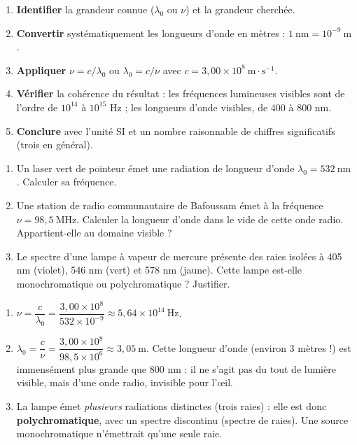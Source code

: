 \documentclass[11pt]{article}
\begin{document}
\begin{methode}[Exploiter la relation $\lambda_0 = c/\nu$ sans se tromper]
\begin{enumerate}
\item \textbf{Identifier} la grandeur connue ($\lambda_0$ ou $\nu$) et la grandeur cherchée.
\item \textbf{Convertir} systématiquement les longueurs d'onde en mètres : $1\ \text{nm} = 10^{-9}\ \text{m}$.
\item \textbf{Appliquer} $\nu = c/\lambda_0$ ou $\lambda_0 = c/\nu$ avec $c = 3{,}00 \times 10^{8}\ \text{m}\cdot\text{s}^{-1}$.
\item \textbf{Vérifier} la cohérence du résultat : les fréquences lumineuses visibles sont de l'ordre de $10^{14}$ à $10^{15}$ Hz ; les longueurs d'onde visibles, de 400 à 800 nm.
\item \textbf{Conclure} avec l'unité SI et un nombre raisonnable de chiffres significatifs (trois en général).
\end{enumerate}
\end{methode}

\begin{exercice}
\begin{enumerate}
\item Un laser vert de pointeur émet une radiation de longueur d'onde $\lambda_0 = 532\ \text{nm}$. Calculer sa fréquence.
\item Une station de radio communautaire de Bafoussam émet à la fréquence $\nu = 98{,}5\ \text{MHz}$. Calculer la longueur d'onde dans le vide de cette onde radio. Appartient-elle au domaine visible ?
\item Le spectre d'une lampe à vapeur de mercure présente des raies isolées à 405 nm (violet), 546 nm (vert) et 578 nm (jaune). Cette lampe est-elle monochromatique ou polychromatique ? Justifier.
\end{enumerate}
\end{exercice}

\begin{corrige}[Exercice]
\begin{enumerate}
\item $\nu = \dfrac{c}{\lambda_0} = \dfrac{3{,}00 \times 10^{8}}{532 \times 10^{-9}} \approx 5{,}64 \times 10^{14}\ \text{Hz}$.
\item $\lambda_0 = \dfrac{c}{\nu} = \dfrac{3{,}00 \times 10^{8}}{98{,}5 \times 10^{6}} \approx 3{,}05\ \text{m}$. Cette longueur d'onde (environ 3 mètres !) est immensément plus grande que 800 nm : il ne s'agit pas du tout de lumière visible, mais d'une onde radio, invisible pour l'œil.
\item La lampe émet \emph{plusieurs} radiations distinctes (trois raies) : elle est donc \textbf{polychromatique}, avec un spectre discontinu (spectre de raies). Une source monochromatique n'émettrait qu'une seule raie.
\end{enumerate}
\end{corrige}
\end{document}
